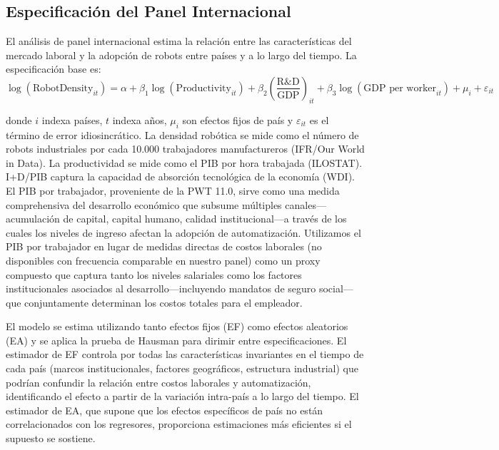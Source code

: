 \documentclass{article}
\begin{document}
\subsection{Especificaci\'on del Panel Internacional}
\label{subsec:panel_spec}

El an\'alisis de panel internacional estima la relaci\'on entre las caracter\'isticas del mercado laboral y la adopci\'on de robots entre pa\'ises y a lo largo del tiempo. La especificaci\'on base es:
\begin{equation}
\log(\text{RobotDensity}_{it}) = \alpha + \beta_1 \log(\text{Productivity}_{it}) + \beta_2 \left(\frac{\text{R\&D}}{\text{GDP}}\right)_{it} + \beta_3 \log(\text{GDP per worker}_{it}) + \mu_i + \varepsilon_{it}
\label{eq:panel}
\end{equation}

\noindent donde $i$ indexa pa\'ises, $t$ indexa a\~nos, $\mu_i$ son efectos fijos de pa\'is y $\varepsilon_{it}$ es el t\'ermino de error idiosincr\'atico. La densidad rob\'otica se mide como el n\'umero de robots industriales por cada 10.000 trabajadores manufactureros (IFR/Our World in Data). La productividad se mide como el PIB por hora trabajada (ILOSTAT). I+D/PIB captura la capacidad de absorci\'on tecnol\'ogica de la econom\'ia (WDI). El PIB por trabajador, proveniente de la PWT 11.0, sirve como una medida comprehensiva del desarrollo econ\'omico que subsume m\'ultiples canales---acumulaci\'on de capital, capital humano, calidad institucional---a trav\'es de los cuales los niveles de ingreso afectan la adopci\'on de automatizaci\'on. Utilizamos el PIB por trabajador en lugar de medidas directas de costos laborales (no disponibles con frecuencia comparable en nuestro panel) como un proxy compuesto que captura tanto los niveles salariales como los factores institucionales asociados al desarrollo---incluyendo mandatos de seguro social---que conjuntamente determinan los costos totales para el empleador.

El modelo se estima utilizando tanto efectos fijos (EF) como efectos aleatorios (EA) y se aplica la prueba de Hausman para dirimir entre especificaciones. El estimador de EF controla por todas las caracter\'isticas invariantes en el tiempo de cada pa\'is (marcos institucionales, factores geogr\'aficos, estructura industrial) que podr\'ian confundir la relaci\'on entre costos laborales y automatizaci\'on, identificando el efecto a partir de la variaci\'on intra-pa\'is a lo largo del tiempo. El estimador de EA, que supone que los efectos espec\'ificos de pa\'is no est\'an correlacionados con los regresores, proporciona estimaciones m\'as eficientes si el supuesto se sostiene.
\end{document}
